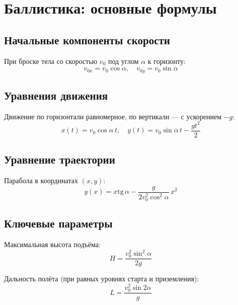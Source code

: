 \documentclass{article}
\begin{document}
\section*{Баллистика: основные формулы}

\subsection*{Начальные компоненты скорости}
При броске тела со скоростью $v_0$ под углом $\alpha$ к горизонту:
\[v_{0x} = v_0\cos\alpha, \quad v_{0y} = v_0\sin\alpha\]

\subsection*{Уравнения движения}
Движение по горизонтали равномерное, по вертикали — с ускорением $-g$:
\[x(t) = v_0\cos\alpha\,t, \quad y(t) = v_0\sin\alpha\,t - \frac{gt^2}{2}\]

\subsection*{Уравнение траектории}
Парабола в координатах $(x,y)$:
\[y(x) = x\text{tg}\,\alpha - \frac{g}{2v_0^2\cos^2\alpha}\,x^2\]

\subsection*{Ключевые параметры}
Максимальная высота подъёма:
\[H = \frac{v_0^2\sin^2\alpha}{2g}\]

Дальность полёта (при равных уровнях старта и приземления):
\[L = \frac{v_0^2\sin2\alpha}{g}\]
\end{document}
